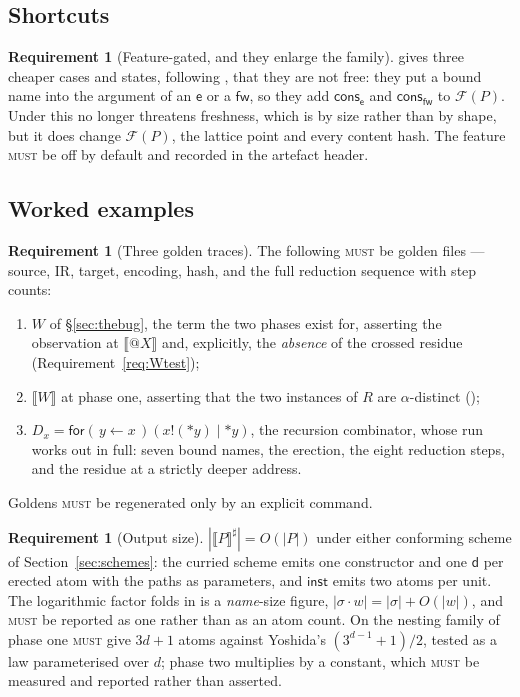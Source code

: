 \documentclass[11pt,a4paper]{article}
\makeatletter
\newcommand{\MUST}{\textsc{must}}
\newcommand{\quo}[1]{@#1}
\newcommand{\drp}[1]{{*}#1}
\newcommand{\inp}[3]{\mathsf{for}(\,#1 \leftarrow #2\,)#3}
\newcommand{\out}[2]{#1!(#2)}
\newcommand{\enc}[1]{\llbracket #1 \rrbracket}
\newcommand{\dd}{\mathsf{d}}
\newcommand{\fw}{\mathsf{fw}}
\newcommand{\ev}{\mathsf{e}}
\newcommand{\cons}{\mathsf{cons}}
\newcommand{\inst}{\mathsf{inst}}
\theoremstyle{definition}
\newtheorem{requirement}[definition]{Requirement}
\theoremstyle{plain}
\makeatother
\begin{document}
\subsection{Shortcuts}

\begin{requirement}[Feature-gated, and they enlarge the family]
\label{req:shortcuts}
\cite[Rem.~6.4]{draft3} gives three cheaper cases and states, following
\cite[Rem.~3.13]{draft3}, that they are not free: they put a bound name into
the argument of an $\ev$ or a $\fw$, so they add $\cons_{\ev}$ and
$\cons_{\fw}$ to $\mathcal{F}(P)$. Under
\cite[Lem.~6.14]{draft3} this no longer threatens freshness, which is by size
rather than by shape, but it does change $\mathcal{F}(P)$, the lattice point
and every content hash. The feature \MUST{} be off by default and recorded in
the artefact header.
\end{requirement}

\subsection{Worked examples}

\begin{requirement}[Three golden traces]\label{req:golden}
The following \MUST{} be golden files --- source, IR, target, encoding, hash,
and the full reduction sequence with step counts:
\begin{enumerate}[leftmargin=1.8em,label=(\roman*)]
\item $W$ of \S\ref{sec:thebug}, the term the two phases exist for, asserting
the observation at $\enc{\quo{X}}$ and, explicitly, the \emph{absence} of the
crossed residue (Requirement~\ref{req:Wtest});
\item $\enc{W}$ at phase one, asserting that the two instances of $R$ are
$\alpha$-distinct (\cite[Ex.~6.5]{draft3});
\item $D_{x} = \inp{y}{x}{(\out{x}{\drp{y}} \mid \drp{y})}$, the recursion
combinator, whose run \cite[Ex.~6.9]{draft3} works out in full: seven bound
names, the erection, the eight reduction steps, and the residue at a strictly
deeper address.
\end{enumerate}
Goldens \MUST{} be regenerated only by an explicit command.
\end{requirement}

\begin{requirement}[Output size]\label{req:size}
$|\enc{P}^{\sharp}| = O(|P|)$ under either conforming scheme of
Section~\ref{sec:schemes}: the curried scheme emits one constructor and one
$\dd$ per erected atom with the paths as parameters, and $\inst$ emits two
atoms per unit. The logarithmic factor \cite[Prop.~8.1]{draft3} folds in is a
\emph{name}-size figure, $|\sigma\!\cdot\!w| = |\sigma| + O(|w|)$, and \MUST{}
be reported as one rather than as an atom count. On the nesting family of
\cite[Prop.~8.2]{draft3} phase one \MUST{} give $3d+1$ atoms against Yoshida's
$(3^{d-1}+1)/2$, tested as a law parameterised over $d$; phase two multiplies
by a constant, which \MUST{} be measured and reported rather than asserted.
\end{requirement}
\end{document}
